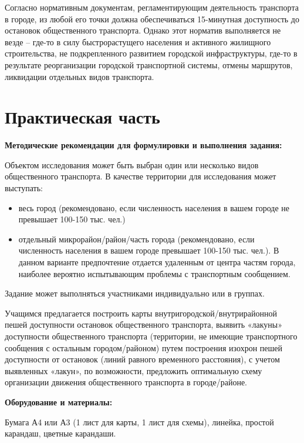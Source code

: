 \documentclass[
  11pt,
  russian,
]{book}
\begin{document}
Согласно нормативным документам, регламентирующим деятельность транспорта в городе, из любой его
точки должна обеспечиваться 15-минутная доступность до остановок общественного транспорта. Однако этот норматив выполняется не везде -- где-то в силу быстрорастущего населения и активного жилищного строительства, не подкрепленного развитием городской инфраструктуры, где-то в результате реорганизации городской транспортной системы, отмены маршрутов, ликвидации отдельных видов транспорта.

\hypertarget{ux43fux440ux430ux43aux442ux438ux447ux435ux441ux43aux430ux44f-ux447ux430ux441ux442ux44c-3}{%
\section{Практическая часть}\label{ux43fux440ux430ux43aux442ux438ux447ux435ux441ux43aux430ux44f-ux447ux430ux441ux442ux44c-3}}

\textbf{Методические рекомендации для формулировки и выполнения задания:}

Объектом исследования
может быть выбран один или несколько видов общественного транспорта. В качестве
территории для исследования может выступать:

\begin{itemize}
\item
  весь город (рекомендовано, если численность населения в вашем городе не превышает 100-150 тыс. чел.)
\item
  отдельный микрорайон/район/часть города (рекомендовано, если численность населения в вашем городе превышает 100-150 тыс. чел.). В данном варианте предпочтение отдается удаленным от центра частям города, наиболее вероятно испытывающим проблемы с транспортным сообщением.
\end{itemize}

Задание может выполняться участниками индивидуально или в группах.

Учащимся предлагается построить карты внутригородской/внутрирайонной пешей доступности остановок общественного транспорта, выявить «лакуны» доступности общественного транспорта (территории, не имеющие транспортного сообщения с остальным городом/районом) путем построения изохрон пешей доступности от остановок
(линий равного временного расстояния), с учетом выявленных «лакун», по возможности, предложить оптимальную схему организации движения общественного транспорта в городе/районе.

\textbf{Оборудование и материалы:}

Бумага А4 или А3 (1 лист для карты, 1 лист для схемы), линейка, простой карандаш, цветные карандаши.
\end{document}
